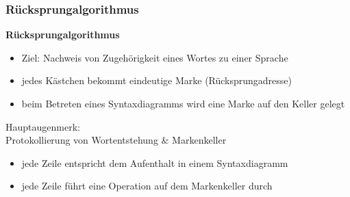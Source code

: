 \documentclass{beamer}
\begin{document}
\begin{frame} \frametitle{Rücksprungalgorithmus}
	\small
	\textbf{Rücksprungalgorithmus}
	\begin{itemize}
		\item Ziel: Nachweis von Zugehörigkeit eines Wortes zu einer Sprache
		\item jedes Kästchen bekommt eindeutige Marke (Rücksprungadresse)
		\item beim Betreten eines Syntaxdiagramms wird eine Marke auf den Keller gelegt
	\end{itemize}

	Hauptaugenmerk: \\
	Protokollierung von Wortentstehung \& Markenkeller
	\begin{itemize}
		\item jede Zeile entspricht dem Aufenthalt in einem Syntaxdiagramm
		\item jede Zeile führt eine Operation auf dem Markenkeller durch
	\end{itemize}
\end{frame}
\end{document}
